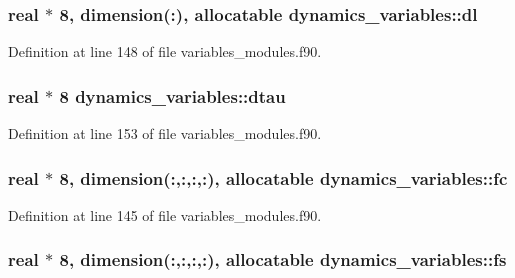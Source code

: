 \subsubsection[{\texorpdfstring{dl}{dl}}]{\setlength{\rightskip}{0pt plus 5cm}real $\ast$ 8, dimension(\+:), allocatable dynamics\+\_\+variables\+::dl}\hypertarget{namespacedynamics__variables_a969e1e44448d09e33d3f8a77ea0dbc6a}{}\label{namespacedynamics__variables_a969e1e44448d09e33d3f8a77ea0dbc6a}


Definition at line 148 of file variables\+\_\+modules.\+f90.

\subsubsection[{\texorpdfstring{dtau}{dtau}}]{\setlength{\rightskip}{0pt plus 5cm}real $\ast$ 8 dynamics\+\_\+variables\+::dtau}\hypertarget{namespacedynamics__variables_aceafdd63e4e63ce7758f0052ca50638f}{}\label{namespacedynamics__variables_aceafdd63e4e63ce7758f0052ca50638f}


Definition at line 153 of file variables\+\_\+modules.\+f90.

\subsubsection[{\texorpdfstring{fc}{fc}}]{\setlength{\rightskip}{0pt plus 5cm}real $\ast$ 8, dimension(\+:,\+:,\+:,\+:), allocatable dynamics\+\_\+variables\+::fc}\hypertarget{namespacedynamics__variables_a14b6bfb7fef60f79297bef079ff3abd1}{}\label{namespacedynamics__variables_a14b6bfb7fef60f79297bef079ff3abd1}


Definition at line 145 of file variables\+\_\+modules.\+f90.

\subsubsection[{\texorpdfstring{fs}{fs}}]{\setlength{\rightskip}{0pt plus 5cm}real $\ast$ 8, dimension(\+:,\+:,\+:,\+:), allocatable dynamics\+\_\+variables\+::fs}\hypertarget{namespacedynamics__variables_a2cd5b8b80f9bebe0e15a0d532d082d5c}{}\label{namespacedynamics__variables_a2cd5b8b80f9bebe0e15a0d532d082d5c}


